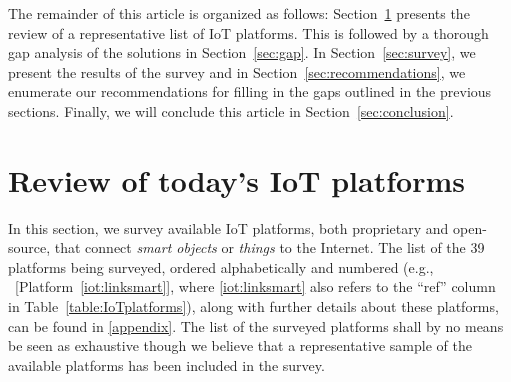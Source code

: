\documentclass[preprint,10pt,5p]{elsarticle}
\newcommand{\citeiot}[1]{[Platform~\ref{#1}]}
\begin{document}
The remainder of this article is organized as follows:
Section~\ref{sec:review} presents the review of a representative list
of IoT platforms. 
This is followed by a thorough gap analysis of the solutions in
Section~\ref{sec:gap}. 
In Section~\ref{sec:survey}, we present the results of the survey and
in Section~\ref{sec:recommendations}, we enumerate our recommendations
for filling in the gaps outlined in the previous sections. 
Finally, we will conclude this article in
Section~\ref{sec:conclusion}.


\section{Review of today's IoT platforms}\label{sec:review}

In this section, we survey available IoT platforms, both
proprietary and open-source, that connect
\emph{smart objects} or \emph{things} to the Internet.
The list of the 39 platforms being surveyed, ordered alphabetically
and numbered (e.g., ~\citeiot{iot:linksmart}, where
\ref{iot:linksmart} also refers to the ``ref'' column in
Table~\ref{table:IoTplatforms}), 
along with further details about these platforms, can be found in
\ref{appendix}.
The list of the surveyed platforms shall by no means be seen as
exhaustive though we believe that a representative
sample of the available platforms has been included in the survey.
\end{document}

